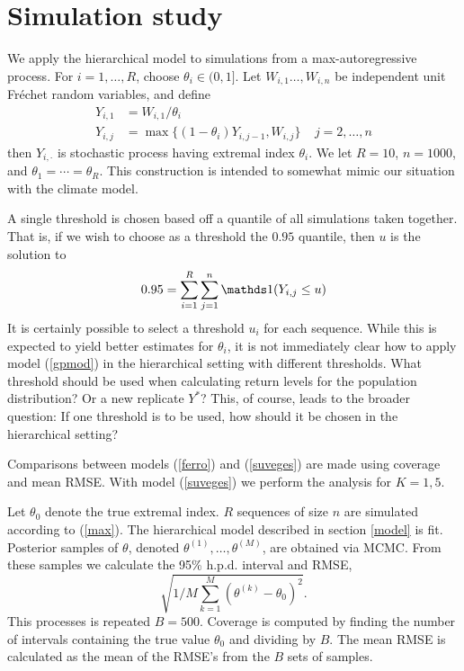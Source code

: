 \section{Simulation study}
\label{sim}

We apply the hierarchical model to simulations from a max-autoregressive process. For $i=1,\ldots,R$, choose $\theta_i\in(0,1]$. Let $W_{i,1}\ldots,W_{i,n}$ be independent unit Fr{\'e}chet random variables, and define
\begin{align}
Y_{i,1} &= W_{i,1}/\theta_i \nonumber \\
Y_{i,j} &= \max\{(1-\theta_i)Y_{i,j-1}, W_{i,j}\}~~~~~j=2,\ldots,n \label{max}
\end{align}
then $Y_{i,\cdot}$ is stochastic process having extremal index $\theta_i$. We let $R=10$, $n=1000$, and $\theta_1=\cdots=\theta_R$. This construction is intended to somewhat mimic our situation with the climate model.

A single threshold is chosen based off a quantile of all simulations taken together. That is, if we wish to choose as a threshold the $0.95$ quantile, then $u$ is the solution to
\[ 0.95 = \sum_{i=1}^R\sum_{j=1}^n\ind(Y_{i,j} \leq u) \]
It is certainly possible to select a threshold $u_i$ for each sequence. While this is expected to yield better estimates for $\theta_i$, it is not immediately clear how to apply model (\ref{gpmod}) in the hierarchical setting with different thresholds. What threshold should be used when calculating return levels for the population distribution? Or a new replicate $Y^*$? This, of course, leads to the broader question: If one threshold is to be used, how should it be chosen in the hierarchical setting?

Comparisons between models (\ref{ferro}) and (\ref{suveges}) are made using coverage and mean RMSE. With model (\ref{suveges}) we perform the analysis for $K=1,5$.

Let $\theta_0$ denote the true extremal index. $R$ sequences of size $n$ are simulated according to (\ref{max}). The hierarchical model described in section \ref{model} is fit. Posterior samples of $\theta$, denoted $\theta^{(1)},\ldots,\theta^{(M)}$, are obtained via MCMC. From these samples we calculate the 95\% h.p.d. interval and RMSE,
\[ \sqrt{1/M \sum_{k=1}^M\left(\theta^{(k)}-\theta_0\right)^2}. \]
This processes is repeated $B=500$. Coverage is computed by finding the number of intervals containing the true value $\theta_0$ and dividing by $B$. The mean RMSE is calculated as the mean of the RMSE's from the $B$ sets of samples.

